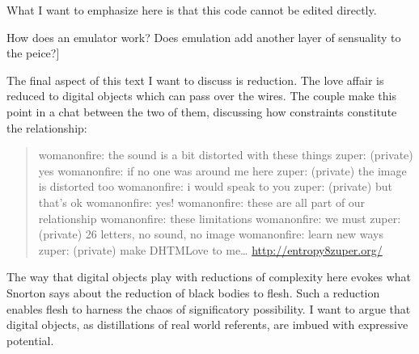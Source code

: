 \documentclass[11pt]{article}
\begin{document}
\begin{enumerate}

What I want to emphasize here is that this code cannot be edited
directly. 

How does an emulator work? Does emulation add another layer of
sensuality to the peice?]

The final aspect of this text I want to discuss is reduction. The love
affair is reduced to digital objects which can pass over the
wires. The couple make this point in a chat between the two of them,
discussing how constraints constitute the relationship:
\begin{quote}
womanonfire: the sound is a bit distorted with these things
zuper: (private) yes
womanonfire: if no one was around me here
zuper: (private) the image is distorted too
womanonfire: i would speak to you
zuper: (private) but that's ok
womanonfire: yes!
womanonfire: these are all part of our relationship
womanonfire: these limitations
womanonfire: we must
zuper: (private) 26 letters, no sound, no image
womanonfire: learn new ways
zuper: (private) make DHTMLove to me\ldots{} \url{http://entropy8zuper.org/}
\end{quote}

The way that digital objects play with reductions of complexity here
evokes what Snorton says about the reduction of black bodies to
flesh. Such a reduction enables flesh to harness the chaos of
significatory possibility. I want to argue that digital objects, as
distillations of real world referents, are imbued with expressive
potential.


\end{enumerate}
\end{document}
